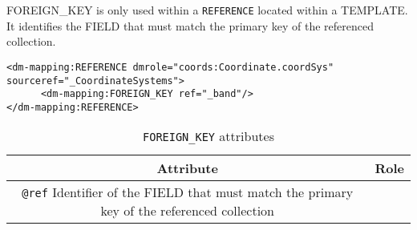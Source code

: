 FOREIGN\_KEY is only used within a \texttt{REFERENCE} located within a TEMPLATE.
It identifies the FIELD that must  match the primary key of the referenced collection.

\begin{lstlisting}[frame=single,caption={The \texttt{REFERENCE} is resolved by the \texttt{INSTANCE} of table \_CoordinateSystems that has a primary key equals to the value of the column  \_band},style=XML,basicstyle=\tiny]
<dm-mapping:REFERENCE dmrole="coords:Coordinate.coordSys" sourceref="_CoordinateSystems">
      <dm-mapping:FOREIGN_KEY ref="_band"/>
</dm-mapping:REFERENCE>
\end{lstlisting}

\begin{table}[!htbp]
\small
\centering
\begin{tabulary}{\linewidth}{|c|J|}       
       \hline 
            \textbf{Attribute} & 
            \textbf {Role}\\
       \hline         \hline  
             \texttt{@ref}  
             Identifier of the FIELD that must  match the primary key of the referenced collection & \\
     \hline
     \end{tabulary}
     \caption{\texttt{FOREIGN\_KEY} attributes} 
     \label{tbl:foreignkey-att}
 \end{table}
